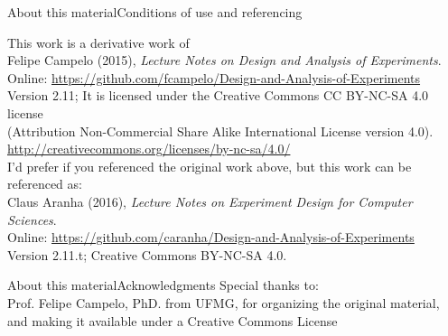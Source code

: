 \documentclass[t]{beamer}
\begin{document}
\begin{ftstf}{About this material}{Conditions of use and referencing}

\centering\footnotesize This work is a derivative work of \\
\centering\footnotesize Felipe Campelo (2015), \textit{Lecture Notes on Design and Analysis of Experiments}.\\
Online: {\scriptsize\url{https://github.com/fcampelo/Design-and-Analysis-of-Experiments}}\\
Version 2.11;
\vone
\centering\footnotesize It is licensed under the Creative Commons CC BY-NC-SA 4.0 license\\(Attribution Non-Commercial Share Alike International License version 4.0).\\
\vhalf
\url{http://creativecommons.org/licenses/by-nc-sa/4.0/}\\
\vone
\footnotesize I'd prefer if you referenced the original work above, but this work can be referenced as:\\
\footnotesize \flushleft Claus Aranha (2016), \textit{Lecture Notes on Experiment Design for Computer Sciences}.\\
Online: {\scriptsize\url{https://github.com/caranha/Design-and-Analysis-of-Experiments}}\\
Version 2.11.t; Creative Commons BY-NC-SA 4.0.\\

\end{ftstf}


\begin{ftst}{About this material}{Acknowledgments}
\footnotesize Special thanks to:\\
\vhalf
\bitems Prof. Felipe Campelo, PhD. from UFMG, for organizing the
original material, and making it available under a Creative Commons
License
\eitem
\end{ftst}
\end{document}
